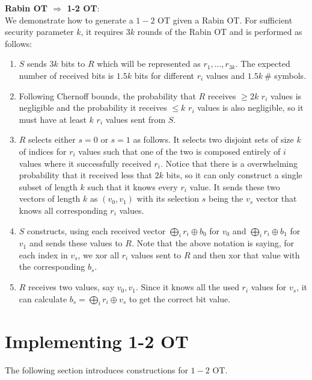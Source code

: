 \documentclass[11pt]{article}
\begin{document}
\textbf{Rabin OT $\Longrightarrow$ 1-2 OT}:\\
We demonstrate how to generate a $1-2$ OT given a Rabin OT. For sufficient security parameter $k$, it requires $3k$ rounds of the Rabin OT and is performed as follows:
\begin{enumerate}
    \item $S$ sends $3k$ bits to $R$ which will be represented as $r_1,...,r_{3k}$. The expected number of received bits is $1.5k$ bits for different $r_i$ values and $1.5k\ \#$ symbols.
    \item Following Chernoff bounds, the probability that $R$ receives $\geq 2k$ $r_i$ values is negligible and the probability it receives $\leq k$ $r_i$ values is also negligible, so it must have at least $k$ $r_i$ values sent from $S$.
    \item $R$ selects either $s=0$ or $s=1$ as follows. It selects two disjoint sets of size $k$ of indices for $r_i$ values such that one of the two is composed entirely of $i$ values where it successfully received $r_i$. Notice that there is a overwhelming probability that it received less that $2k$ bits, so it can only construct a single subset of length $k$ such that it knows every $r_i$ value. It sends these two vectors of length $k$ as $(v_0,v_1)$ with its selection $s$ being the $v_s$ vector that knows all corresponding $r_i$ values.
    \item $S$ constructs, using each received vector $\bigoplus_i r_i \oplus b_0$ for $v_0$ and $\bigoplus_i r_i \oplus b_1$ for $v_1$ and sends these values to $R$. Note that the above notation is saying, for each index in $v_s$, we xor all $r_i$ values sent to $R$ and then xor that value with the corresponding $b_s$.
    \item $R$ receives two values, say $v_0, v_1$. Since it knows all the used $r_i$ values for $v_s$, it can calculate $b_s = \bigoplus_i r_i \oplus v_s$ to get the correct bit value.
\end{enumerate}

\section{Implementing 1-2 OT}
The following section introduces constructions for $1-2$ OT.
\end{document}
